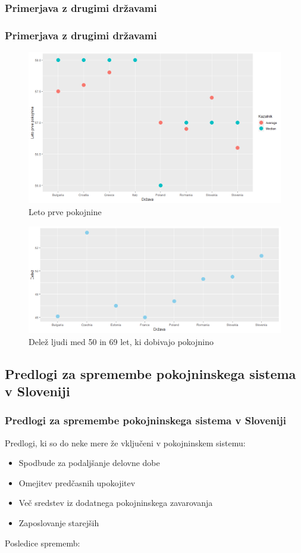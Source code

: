 \documentclass[10pt]{beamer}
\begin{document}
\begin{frame}
\subsubsection[Primerjava z drugimi državami]{Primerjava z drugimi državami}
\frametitle{Primerjava z drugimi državami}
\begin{figure}[h]
\centering
\includegraphics[height = 7 cm]{leto_prve_pokojnine.png}
\caption{Leto prve pokojnine}
\label{Slika 4}
\end{figure}
\end{frame}

\begin{frame}

\begin{figure}[h!]
\centering
\includegraphics[width = 10 cm]{graf_procentualno_pokojnina.png}
\caption{Delež ljudi med 50 in 69 let, ki dobivajo pokojnino}
\label{Slika 5}
\end{figure}
\end{frame}

\begin{frame}
\subsection[Predolgi za spremembe pokojninskega sistema v Sloveniji]{Predlogi za spremembe pokojninskega sistema v Sloveniji}
\frametitle{Predlogi za spremembe pokojninskega sistema v Sloveniji}
Predlogi, ki so do neke mere že vključeni v pokojninskem sistemu:
\begin{itemize}
\item Spodbude za podaljšanje delovne dobe
\item Omejitev predčasnih upokojitev
\item Več sredstev iz dodatnega pokojninskega zavarovanja
\item Zaposlovanje starejših
\end{itemize}

Posledice sprememb:
\end{frame}
\end{document}
